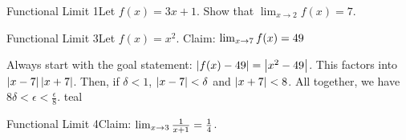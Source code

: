 \begin{example}
    {Functional Limit 1}Let \(f(x) = 3x + 1\). Show that \(\lim_{x \rightarrow 2}f(x) = 7\).
\end{example}




\begin{example}
    {Functional Limit 3}Let \(f(x) = x^{2}\). Claim: \(\lim_{x \rightarrow 7}f(x) = 49\)
\end{example}

%
    {
        Always start with the goal statement: \(\left|f(x) - 49\right| = \left|x^{2} - 49\right|\). This factors into \(\left|x - 7\right| \left|x + 7\right|\). Then, if \(\delta < 1\), \(\left|x - 7\right| < \delta\) and \(\left|x + 7\right| < 8\). All together, we have \(8\delta < \epsilon < \frac{\epsilon}{8}\).
    }%
    {teal}

    \begin{example}
        {Functional Limit 4}Claim: \(\lim_{x \rightarrow 3}\frac{1}{x + 1} = \frac{1}{4}\).
    \end{example}

